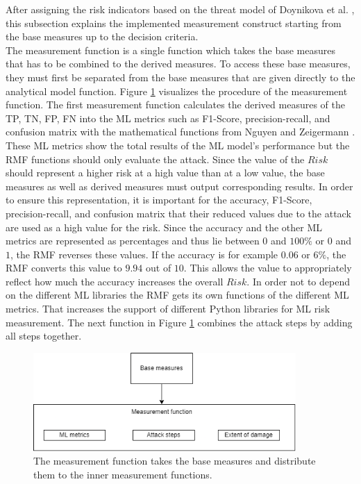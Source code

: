 After assigning the risk indicators based on the threat model of Doynikova et al. \cite{DBLP:conf/crisis/DoynikovaNGK20}, this subsection explains the implemented measurement construct starting from the base measures up to the decision criteria. \\
The measurement function is a single function which takes the base measures that has to be combined to the derived measures. To access these base measures, they must first be separated from the base measures that are given directly to the analytical model function. Figure \ref{fig:impl_meas_func} visualizes the procedure of the measurement function. The first measurement function calculates the derived measures of the TP, TN, FP, FN into the ML metrics such as F1-Score, precision-recall, and confusion matrix with the mathematical functions from Nguyen and Zeigermann \cite{9783960101925}. These ML metrics show the total results of the ML model's performance but the RMF functions should only evaluate the attack.
Since the value of the $Risk$ should represent a higher risk at a high value than at a low value, the base measures as well as derived measures must output corresponding results. In order to ensure this representation, it is important for the accuracy, F1-Score, precision-recall, and confusion matrix that their reduced values due to the attack are used as a high value for the risk. Since the accuracy and the other ML metrics are represented as percentages and thus lie between $0$ and $100\%$ or $0$ and $1$, the RMF reverses these values. If the accuracy
is for example $0.06$ or $6\%$, the RMF converts this value to $9.94$ out of $10$. This allows the value to appropriately reflect how much the accuracy increases the overall $Risk$.
In order not to depend on the different ML libraries the RMF gets its own functions of the different ML metrics. That increases the support of different Python libraries for ML risk measurement. The next function in Figure \ref{fig:impl_meas_func} combines the attack steps by adding all steps together.

\begin{figure}[ht!]
  \centering
  \includegraphics[width=10cm]{pictures/impl_meas_func.png}
  \caption{The measurement function takes the base measures and distribute them to the inner measurement functions.}
  \label{fig:impl_meas_func}
\end{figure}

